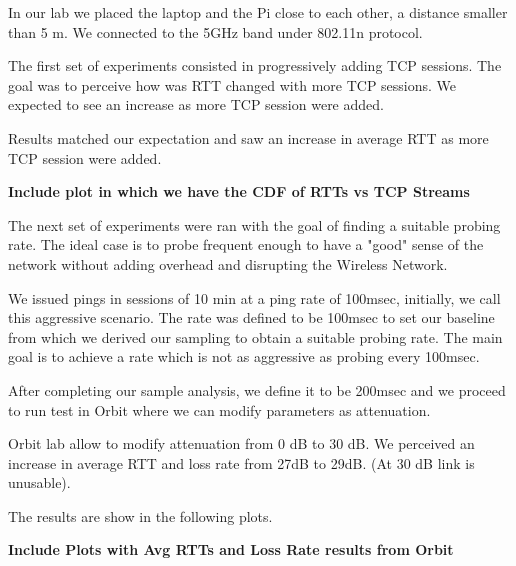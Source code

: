 In our lab we placed the laptop and the Pi close to each other, a distance smaller than 5 m. We connected to the 5GHz band under 802.11n protocol.

The first set of experiments consisted in progressively adding TCP sessions. The goal was to perceive how was RTT changed with more TCP sessions. We expected to see an increase as more TCP session were added.

Results matched our expectation and saw an increase in average RTT as more TCP session were added.

\textbf{Include plot in which we have the CDF of RTTs vs TCP Streams}

The next set of experiments were ran with the goal of finding a suitable probing rate. The ideal case is to probe frequent enough to have a "good" sense of the network without adding overhead and disrupting the Wireless Network.

We issued pings in sessions of 10 min at a ping rate of 100msec, initially, we call this aggressive scenario. The rate was defined to be 100msec to set our baseline from which we derived our sampling to obtain a suitable probing rate. The main goal is to achieve a rate which is not as aggressive as probing every 100msec.

After completing our sample analysis, we define it to be 200msec and we proceed to run test in Orbit where we can modify parameters as attenuation.

Orbit lab allow to modify attenuation from 0 dB to 30 dB. We perceived an increase in average RTT and loss rate from 27dB to 29dB. (At 30 dB link is unusable).

The results are show in the following plots.

\textbf{Include Plots with Avg RTTs and Loss Rate results from Orbit}





